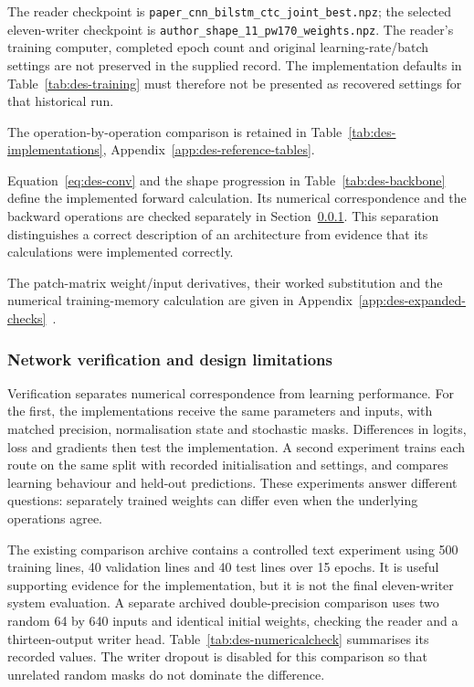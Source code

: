 The reader checkpoint is \texttt{paper\_cnn\_bilstm\_ctc\_joint\_best.npz}; the selected eleven-writer checkpoint is \texttt{author\_shape\_11\_pw170\_weights.npz}. The reader's training computer, completed epoch count and original learning-rate/batch settings are not preserved in the supplied record. The implementation defaults in Table~\ref{tab:des-training} must therefore not be presented as recovered settings for that historical run.~\cite[recognise.py; train.py; trainlibrary.py]{braunepipeline2026}

The operation-by-operation comparison is retained in Table~\ref{tab:des-implementations}, Appendix~\ref{app:des-reference-tables}.~\cite[recognise.py; train.py]{braunepipeline2026}


Equation~\ref{eq:des-conv} and the shape progression in Table~\ref{tab:des-backbone} define the implemented forward calculation. Its numerical correspondence and the backward operations are checked separately in Section~\ref{sec:des-netverify}. This separation distinguishes a correct description of an architecture from evidence that its calculations were implemented correctly.~\cite[recognise.py; train.py; trainlibrary.py]{braunepipeline2026}

The patch-matrix weight/input derivatives, their worked substitution and the numerical training-memory calculation are given in Appendix~\ref{app:des-expanded-checks}~\cite[train.py, Conv2dBackward]{braunepipeline2026}.

\subsubsection{Network verification and design limitations}
\label{sec:des-netverify}
Verification separates numerical correspondence from learning performance. For the first, the implementations receive the same parameters and inputs, with matched precision, normalisation state and stochastic masks. Differences in logits, loss and gradients then test the implementation. A second experiment trains each route on the same split with recorded initialisation and settings, and compares learning behaviour and held-out predictions. These experiments answer different questions: separately trained weights can differ even when the underlying operations agree.~\cite[recognise.py; train.py; trainlibrary.py]{braunepipeline2026}


The existing comparison archive contains a controlled text experiment using 500 training lines, 40 validation lines and 40 test lines over 15 epochs. It is useful supporting evidence for the implementation, but it is not the final eleven-writer system evaluation. A separate archived double-precision comparison uses two random 64 by 640 inputs and identical initial weights, checking the reader and a thirteen-output writer head. Table~\ref{tab:des-numericalcheck} summarises its recorded values. The writer dropout is disabled for this comparison so that unrelated random masks do not dominate the difference.~\cite[recognise.py; train.py]{braunepipeline2026}



